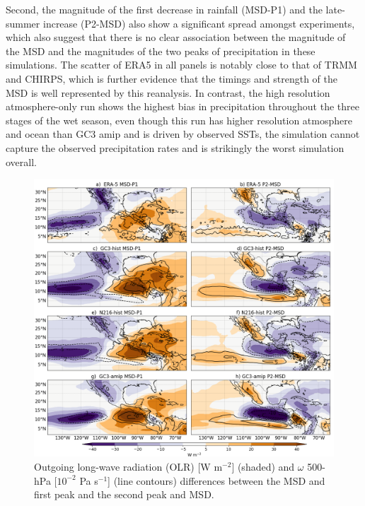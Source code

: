  
Second, the magnitude of the first decrease in rainfall (MSD-P1) and the late-summer increase (P2-MSD) also show a significant spread amongst experiments, which also suggest that there is no clear association between the magnitude of the MSD and the magnitudes of the two peaks of precipitation in these simulations. The scatter of ERA5 in all panels is notably close to that of TRMM and CHIRPS, which is further evidence that the timings and strength of the MSD is well represented by this reanalysis. In contrast, the high resolution atmosphere-only run shows the highest bias in precipitation throughout the three stages of the wet season, even though this run has higher resolution atmosphere and ocean than GC3 amip and is driven by observed SSTs, the simulation cannot capture the observed precipitation rates and is strikingly the worst simulation overall. %


 \begin{figure}[t!]
\includegraphics[width=\linewidth]{figures/fig4_olrv_3.png}
\caption[OLR and vertical velocity composites]{Outgoing long-wave radiation (OLR) [W m$^{-2}$] (shaded) and $\omega$ 500-hPa [$10^{-2}$ Pa s$^{-1}$] (line contours) differences between the MSD and first peak and the second peak and MSD.}
\label{fig:olranom}
\end{figure}

